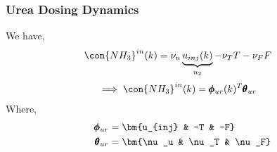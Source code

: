 \subsubsection{Urea Dosing Dynamics}
We have,
\begin{align*}
        \con{NH_3}^{in}(k) &= \nu_u \underbrace{u_{inj}(k)}_{u_2} - \nu_T T - \nu_F F
\end{align*}
\begin{align}
        \implies \con{NH_3}^{in}(k)  &= \pmb \phi_{ur}(k) ^T \pmb \theta_{ur}  \label{eqn::urea_parm}
\end{align}
Where,
\begin{align*}
        \pmb \phi_{ur} &= \bm{u_{inj} & -T & -F}\\
        \pmb \theta_{ur} &= \bm{\nu_u & \nu_T & \nu_F}
\end{align*}
